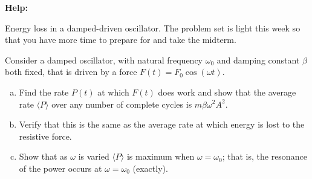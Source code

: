 \documentclass[11pt,letterpaper,boxed]{../hmcpsetrhino}
\begin{document}
\textbf{Help:}

\begin{problem}[i]
Energy loss in a damped-driven oscillator. The problem set is light this week so that you have more time to prepare for and take the midterm.

\begin{problem}
Consider a damped oscillator, with natural frequency $\omega_0$ and damping constant $\beta$ both fixed, that is driven by a force $F(t) = F_0 \cos (\omega t)$.

\begin{enumerate}[(a)]
\item Find the rate $P(t)$ at which $F(t)$ does work and show that the average rate $\langle P \rangle$ over any number of complete cycles is $m \beta \omega^2 A^2$.

\item Verify that this is the same as the average rate at which energy is lost to the resistive force.

\item Show that as $\omega$ is varied $\langle P \rangle$ is maximum when $\omega = \omega_0$; that is, the resonance of the power occurs at $\omega = \omega_0$ (exactly).

\end{enumerate}
\end{problem}
\end{problem}
\begin{solution}


\vfill
\end{solution}
\end{document}
